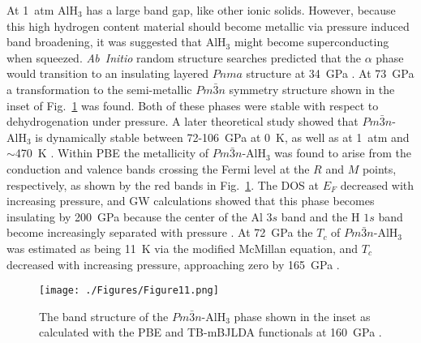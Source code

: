 \documentclass[12pt,letterpaper,oneside]{article}
\begin{document}
At 1~atm AlH$_3$ has a large band gap, like other ionic solids. However, because this high hydrogen content material should become metallic via pressure induced band broadening, it was suggested that AlH$_3$ might become superconducting when squeezed. \emph{Ab~Initio} random structure searches predicted that the $\alpha$ phase would transition to an insulating layered $Pnma$ structure at 34~GPa \cite{Pickard:2007b}. At 73~GPa a transformation to the semi-metallic $Pm\bar{3}n$ symmetry structure shown in the inset of Fig.\ \ref{fig:aluminum} was found. Both of these phases were stable with respect to dehydrogenation under pressure. A later theoretical study showed that $Pm\bar{3}n$-AlH$_3$ is dynamically stable between 72-106~GPa at 0~K, as well as at 1~atm and $\sim$470~K \cite{Kim:2008-Al}. Within PBE the metallicity of $Pm\bar{3}n$-AlH$_3$ was found to arise from the conduction and valence bands crossing the Fermi level at the $R$ and $M$ points, respectively, as shown by the red bands in Fig.\ \ref{fig:aluminum}. The DOS at $E_F$ decreased with increasing pressure, and GW calculations showed that this phase becomes insulating by 200~GPa because the center of the Al $3s$ band and the H $1s$ band become increasingly separated with pressure \cite{Geshi:2013-Al}. At 72~GPa the $T_c$ of $Pm\bar{3}n$-AlH$_3$ was estimated as being 11~K via the modified McMillan equation, and $T_c$ decreased with increasing pressure, approaching zero by 165~GPa \cite{Wei:2013-Al}. 

\begin{figure}[h!]
\begin{center}
\texttt{[image: ./Figures/Figure11.png]}
\end{center}
\caption{The band structure of the $Pm\bar{3}n$-AlH$_3$ phase shown in the inset as calculated with the PBE and TB-mBJLDA functionals at 160~GPa \cite{Shi:2012-Al}.}
\label{fig:aluminum}
\end{figure}
\end{document}
